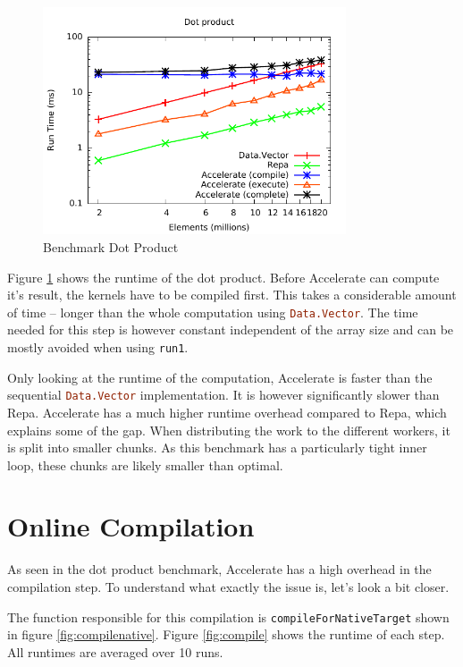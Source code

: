 \documentclass[a4paper,bibliography=totocnumbered,parskip,headsepline]{scrbook}
\begin{document}
\begin{figure}
    \centering
    \includegraphics[width=0.8\textwidth]{images/benchmarks/dotp/dotp}
    \caption{Benchmark Dot Product}
    \label{fig:dotpbench}
\end{figure}

Figure \ref{fig:dotpbench} shows the runtime of the dot product.
Before Accelerate can compute it's result, the kernels have to be compiled first.
This takes a considerable amount of time -- longer than the whole computation using \lstinline[language=haskell]{Data.Vector}.
The time needed for this step is however constant independent of the array size and can be mostly avoided when using \lstinline[language=haskell]{run1}.

Only looking at the runtime of the computation, Accelerate is faster than the sequential \lstinline[language=haskell]{Data.Vector} implementation.
It is however significantly slower than Repa.
Accelerate has a much higher runtime overhead compared to Repa, which explains some of the gap.
When distributing the work to the different workers, it is split into smaller chunks.
As this benchmark has a particularly tight inner loop, these chunks are likely smaller than optimal.

\section{Online Compilation}
As seen in the dot product benchmark, Accelerate has a high overhead in the compilation step.
To understand what exactly the issue is, let's look a bit closer.

The function responsible for this compilation is \lstinline[language=haskell]{compileForNativeTarget} shown in figure \ref{fig:compilenative}.
Figure \ref{fig:compile} shows the runtime of each step.
All runtimes are averaged over 10 runs.
\end{document}
